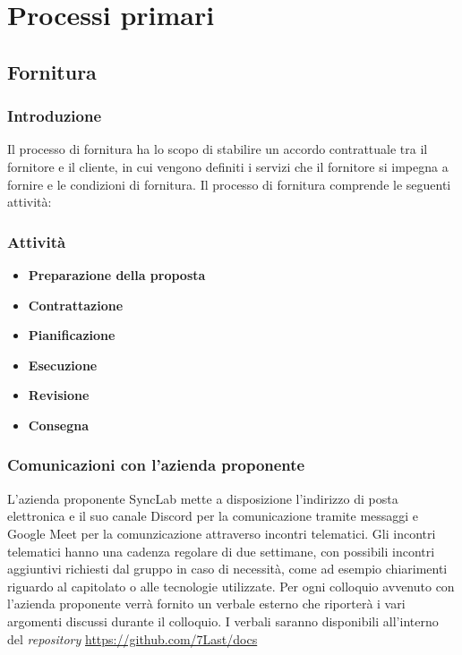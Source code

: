 \section{Processi primari}
\subsection{Fornitura}
\subsubsection{Introduzione}
Il processo di fornitura ha lo scopo di stabilire un accordo contrattuale tra il fornitore e il cliente, in cui vengono definiti i servizi che il fornitore si impegna a fornire e le condizioni di fornitura. 
Il processo di fornitura comprende le seguenti attività:
\subsubsection{Attività}
\begin{itemize}
	\item \textbf{Preparazione della proposta}
	\item \textbf{Contrattazione}
	\item \textbf{Pianificazione}
	\item \textbf{Esecuzione}
	\item \textbf{Revisione}
	\item \textbf{Consegna}
\end{itemize}

\subsubsection{Comunicazioni con l'azienda proponente}
L'azienda proponente SyncLab mette a disposizione l'indirizzo di posta elettronica e il suo canale Discord per la comunicazione tramite messaggi e Google Meet per la comunzicazione attraverso incontri telematici.
Gli incontri telematici hanno una cadenza regolare di due settimane, con possibili incontri aggiuntivi richiesti dal gruppo in caso di necessità, come ad esempio chiarimenti riguardo al capitolato o alle tecnologie utilizzate.
Per ogni colloquio avvenuto con l'azienda proponente verrà fornito un verbale esterno che riporterà i vari argomenti discussi durante il colloquio.
I verbali saranno disponibili all'interno del \textit{repository} \url{https://github.com/7Last/docs}
